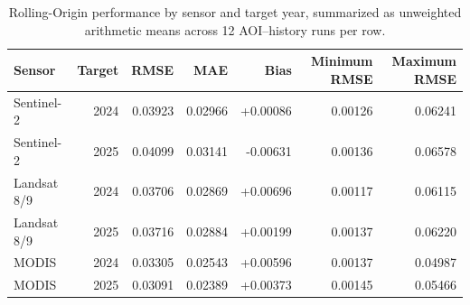 \begin{table}[!htbp]\centering\footnotesize
\caption{Rolling-Origin performance by sensor and target year, summarized as unweighted arithmetic means across 12 AOI--history runs per row.}\label{tab:rolling}
\begin{tabular}{lrrrrrr}\toprule
Sensor & Target & RMSE & MAE & Bias & Minimum RMSE & Maximum RMSE \\\midrule
Sentinel-2 & 2024 & 0.03923 & 0.02966 & +0.00086 & 0.00126 & 0.06241 \\
Sentinel-2 & 2025 & 0.04099 & 0.03141 & -0.00631 & 0.00136 & 0.06578 \\
Landsat 8/9 & 2024 & 0.03706 & 0.02869 & +0.00696 & 0.00117 & 0.06115 \\
Landsat 8/9 & 2025 & 0.03716 & 0.02884 & +0.00199 & 0.00137 & 0.06220 \\
MODIS & 2024 & 0.03305 & 0.02543 & +0.00596 & 0.00137 & 0.04987 \\
MODIS & 2025 & 0.03091 & 0.02389 & +0.00373 & 0.00145 & 0.05466 \\
\bottomrule\end{tabular}
\end{table}
